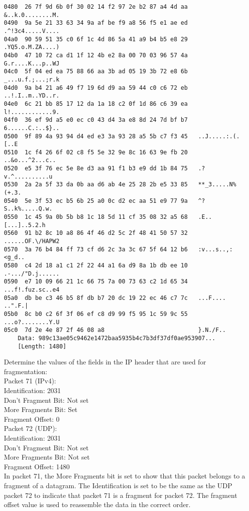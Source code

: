 \begin{lstlisting}
0480  26 7f 9d 6b 0f 30 02 14 f2 97 2e b2 87 a4 4d aa   &..k.0........M.
0490  9a 5e 21 33 63 34 9a af be f9 a8 56 f5 e1 ae ed   .^!3c4.....V....
04a0  90 59 51 35 c0 6f 1c 4d 86 5a 41 a9 b4 b5 e8 29   .YQ5.o.M.ZA....)
04b0  47 10 72 ca d1 1f 12 4b e2 8a 00 70 03 96 57 4a   G.r....K...p..WJ
04c0  5f 04 ed ea 75 88 66 aa 3b ad 05 19 3b 72 e8 6b   _...u.f.;...;r.k
04d0  9a b4 21 a6 49 f7 19 6d d9 aa 59 44 c0 c6 72 eb   ..!.I..m..YD..r.
04e0  6c 21 bb 85 17 12 da 1a 18 c2 0f 1d 86 c6 39 ea   l!............9.
04f0  36 ef 9d a5 e0 ec c0 43 d4 3a e8 8d 24 7d bf b7   6......C.:..$}..
0500  9f 89 4a 93 94 d4 ed e3 3a 93 28 a5 5b c7 f3 45   ..J.....:.(.[..E
0510  1c f4 26 6f 02 c8 f5 5e 32 9e 8c 16 63 9e fb 20   ..&o...^2...c.. 
0520  e5 3f 76 ec 5e 8e d3 aa 91 f1 b3 e9 dd 1b 84 75   .?v.^..........u
0530  2a 2a 5f 33 da 0b aa d6 ab 4e 25 28 2b e5 33 85   **_3.....N%(+.3.
0540  5e 3f 53 ec b5 6b 25 a0 0c d2 ec aa 51 e9 77 9a   ^?S..k%.....Q.w.
0550  1c 45 9a 0b 5b b8 1c 18 5d 11 cf 35 08 32 a5 68   .E..[...]..5.2.h
0560  91 b2 8c 10 a8 86 4f 46 d2 5c 2f 48 41 50 57 32   ......OF.\/HAPW2
0570  3a 76 b4 84 ff 73 cf d6 2c 3a 3c 67 5f 64 12 b6   :v...s..,:<g_d..
0580  c4 2d 18 a1 c1 2f 22 44 a1 6a d9 8a 1b db ee 10   .-.../"D.j......
0590  e7 10 09 66 21 1c 66 75 7a 00 73 63 c2 1d 65 34   ...f!.fuz.sc..e4
05a0  db be c3 46 b5 8f db b7 20 dc 19 22 ec 46 c7 7c   ...F.... ..".F.|
05b0  8c b0 c2 6f 3f 06 ef c8 d9 99 f5 95 1c 59 9c 55   ...o?........Y.U
05c0  7d 2e 4e 87 2f 46 08 a8                           }.N./F..
    Data: 989c13ae05c9462e1472baa5935b4c7b3df37df0ae953907...
    [Length: 1480]
\end{lstlisting}


Determine the values of the fields in the IP header that are used for fragmentation: \\

Packet 71 (IPv4): \\
Identification: 2031\\
Don't Fragment Bit: Not set\\
More Fragments Bit: Set\\
Fragment Offset: 0\\

Packet 72 (UDP): \\
Identification: 2031\\
Don't Fragment Bit: Not set\\
More Fragments Bit: Not set\\
Fragment Offset: 1480\\

In packet 71, the More Fragments bit is set to show that this packet belongs to a fragment of a datagram. The Identification is set to be the same as the UDP packet 72 to indicate that packet 71 is a fragment for packet 72. The fragment offset value is used to reassemble the data in the correct order. \\
